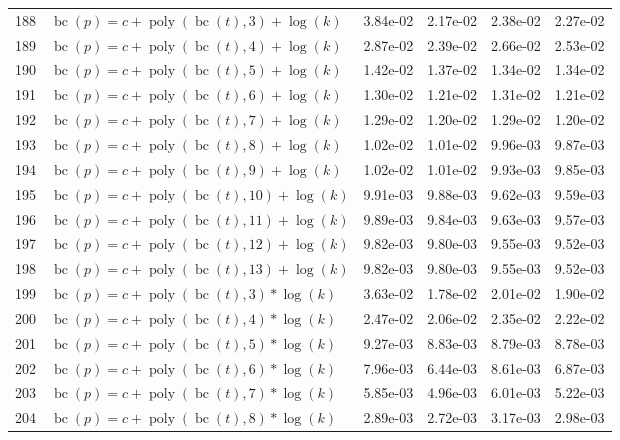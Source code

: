 \documentclass[12pt,a4paper]{article}
\DeclareMathOperator{\bc}{bc}
\DeclareMathOperator{\poly}{poly}
\begin{document}
\begin{longtable}[t]{ll>{\raggedleft\arraybackslash}p{2cm}>{\raggedleft\arraybackslash}p{2cm}>{\raggedleft\arraybackslash}p{2cm}>{\raggedleft\arraybackslash}p{2cm}}
188 & $\bc(p) = c + \poly\left( \bc(t), 3 \right) + \log(k)$ & 3.84e-02 & 2.17e-02 & 2.38e-02 & 2.27e-02\\
\rowcolor{gray!6}  189 & $\bc(p) = c + \poly\left( \bc(t), 4 \right) + \log(k)$ & 2.87e-02 & 2.39e-02 & 2.66e-02 & 2.53e-02\\
190 & $\bc(p) = c + \poly\left( \bc(t), 5 \right) + \log(k)$ & 1.42e-02 & 1.37e-02 & 1.34e-02 & 1.34e-02\\
\rowcolor{gray!6}  191 & $\bc(p) = c + \poly\left( \bc(t), 6 \right) + \log(k)$ & 1.30e-02 & 1.21e-02 & 1.31e-02 & 1.21e-02\\
192 & $\bc(p) = c + \poly\left( \bc(t), 7 \right) + \log(k)$ & 1.29e-02 & 1.20e-02 & 1.29e-02 & 1.20e-02\\
\rowcolor{gray!6}  193 & $\bc(p) = c + \poly\left( \bc(t), 8 \right) + \log(k)$ & 1.02e-02 & 1.01e-02 & 9.96e-03 & 9.87e-03\\
194 & $\bc(p) = c + \poly\left( \bc(t), 9 \right) + \log(k)$ & 1.02e-02 & 1.01e-02 & 9.93e-03 & 9.85e-03\\
\rowcolor{gray!6}  195 & $\bc(p) = c + \poly\left( \bc(t), 10 \right) + \log(k)$ & 9.91e-03 & 9.88e-03 & 9.62e-03 & 9.59e-03\\
196 & $\bc(p) = c + \poly\left( \bc(t), 11 \right) + \log(k)$ & 9.89e-03 & 9.84e-03 & 9.63e-03 & 9.57e-03\\
\rowcolor{gray!6}  197 & $\bc(p) = c + \poly\left( \bc(t), 12 \right) + \log(k)$ & 9.82e-03 & 9.80e-03 & 9.55e-03 & 9.52e-03\\
198 & $\bc(p) = c + \poly\left( \bc(t), 13 \right) + \log(k)$ & 9.82e-03 & 9.80e-03 & 9.55e-03 & 9.52e-03\\
\rowcolor{gray!6}  199 & $\bc(p) = c + \poly\left( \bc(t), 3 \right) * \log(k)$ & 3.63e-02 & 1.78e-02 & 2.01e-02 & 1.90e-02\\
200 & $\bc(p) = c + \poly\left( \bc(t), 4 \right) * \log(k)$ & 2.47e-02 & 2.06e-02 & 2.35e-02 & 2.22e-02\\
\rowcolor{gray!6}  201 & $\bc(p) = c + \poly\left( \bc(t), 5 \right) * \log(k)$ & 9.27e-03 & 8.83e-03 & 8.79e-03 & 8.78e-03\\
202 & $\bc(p) = c + \poly\left( \bc(t), 6 \right) * \log(k)$ & 7.96e-03 & 6.44e-03 & 8.61e-03 & 6.87e-03\\
\rowcolor{gray!6}  203 & $\bc(p) = c + \poly\left( \bc(t), 7 \right) * \log(k)$ & 5.85e-03 & 4.96e-03 & 6.01e-03 & 5.22e-03\\
204 & $\bc(p) = c + \poly\left( \bc(t), 8 \right) * \log(k)$ & 2.89e-03 & 2.72e-03 & 3.17e-03 & 2.98e-03\\

\end{longtable}
\end{document}
